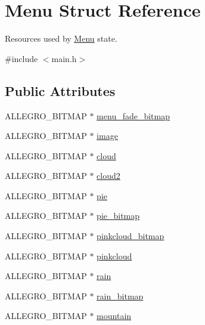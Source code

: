 \hypertarget{structMenu}{\section{Menu Struct Reference}
\label{structMenu}
}


Resources used by \hyperlink{structMenu}{Menu} state.  




{\ttfamily \#include $<$main.\-h$>$}

\subsection*{Public Attributes}
\begin{DoxyCompactItemize}
\item 
A\-L\-L\-E\-G\-R\-O\-\_\-\-B\-I\-T\-M\-A\-P $\ast$ \hyperlink{structMenu_a4d3a2c17b2882c7adf10a15ba49932b4}{menu\-\_\-fade\-\_\-bitmap}
\item 
A\-L\-L\-E\-G\-R\-O\-\_\-\-B\-I\-T\-M\-A\-P $\ast$ \hyperlink{structMenu_a7ac035a3356434a3ce6eae45f876eba9}{image}
\item 
A\-L\-L\-E\-G\-R\-O\-\_\-\-B\-I\-T\-M\-A\-P $\ast$ \hyperlink{structMenu_a9abb4b7b9f726884aa378e746857b6f2}{cloud}
\item 
A\-L\-L\-E\-G\-R\-O\-\_\-\-B\-I\-T\-M\-A\-P $\ast$ \hyperlink{structMenu_a6ee03b8791791ecca4f9a3b9fb1851c1}{cloud2}
\item 
A\-L\-L\-E\-G\-R\-O\-\_\-\-B\-I\-T\-M\-A\-P $\ast$ \hyperlink{structMenu_a397eb035f88ef8138c4ba29f3fc1d63c}{pie}
\item 
A\-L\-L\-E\-G\-R\-O\-\_\-\-B\-I\-T\-M\-A\-P $\ast$ \hyperlink{structMenu_ab46ce3041264bac0aabde3abd7549877}{pie\-\_\-bitmap}
\item 
A\-L\-L\-E\-G\-R\-O\-\_\-\-B\-I\-T\-M\-A\-P $\ast$ \hyperlink{structMenu_a970ef9c492ae797fc59d22fa6cfead71}{pinkcloud\-\_\-bitmap}
\item 
A\-L\-L\-E\-G\-R\-O\-\_\-\-B\-I\-T\-M\-A\-P $\ast$ \hyperlink{structMenu_aec110fca9c47ccf9aaf6e4e7589b86f2}{pinkcloud}
\item 
A\-L\-L\-E\-G\-R\-O\-\_\-\-B\-I\-T\-M\-A\-P $\ast$ \hyperlink{structMenu_a3ba357f6bd47ac51f9aa9b9c381bbe9f}{rain}
\item 
A\-L\-L\-E\-G\-R\-O\-\_\-\-B\-I\-T\-M\-A\-P $\ast$ \hyperlink{structMenu_a9207cdbfc8c670d9069c9a2c64c6ca95}{rain\-\_\-bitmap}
\item 
A\-L\-L\-E\-G\-R\-O\-\_\-\-B\-I\-T\-M\-A\-P $\ast$ \hyperlink{structMenu_a3a957c0b3a961e3c2be9001c15e82208}{mountain}

\end{DoxyCompactItemize}
